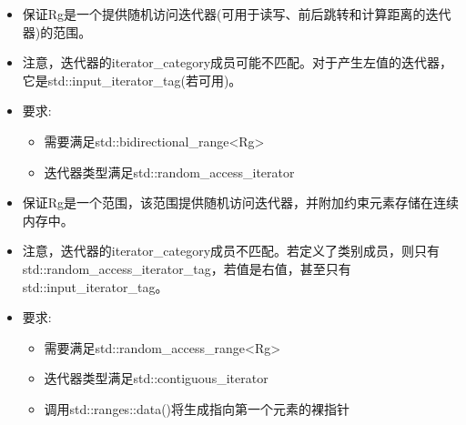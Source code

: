
\begin{itemize}
\item
保证Rg是一个提供随机访问迭代器(可用于读写、前后跳转和计算距离的迭代器)的范围。

\item
注意，迭代器的iterator\_category成员可能不匹配。对于产生左值的迭代器，它是std::input\_iterator\_tag(若可用)。

\item
要求:

\begin{itemize}
\item
需要满足std::bidirectional\_range<Rg>

\item
迭代器类型满足std::random\_access\_iterator
\end{itemize}
\end{itemize}


\begin{itemize}
\item
保证Rg是一个范围，该范围提供随机访问迭代器，并附加约束元素存储在连续内存中。

\item
注意，迭代器的iterator\_category成员不匹配。若定义了类别成员，则只有std::random\_access\_iterator\_tag，若值是右值，甚至只有std::input\_iterator\_tag。

\item
要求:

\begin{itemize}
\item
需要满足std::random\_access\_range<Rg>

\item
迭代器类型满足std::contiguous\_iterator

\item
调用std::ranges::data()将生成指向第一个元素的裸指针
\end{itemize}
\end{itemize}


